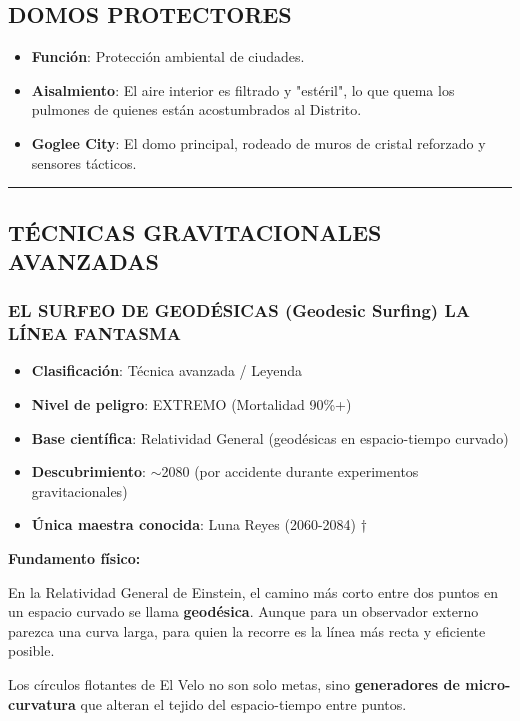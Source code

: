 \documentclass[11pt,a4paper]{report}
\begin{document}
\subsection{DOMOS PROTECTORES}
\begin{itemize}
  \item \textbf{Función}: Protección ambiental de ciudades.
  \item \textbf{Aisalmiento}: El aire interior es filtrado y "estéril", lo que quema los pulmones de quienes están acostumbrados al Distrito.
  \item \textbf{Goglee City}: El domo principal, rodeado de muros de cristal reforzado y sensores tácticos.

\end{itemize}
\bigskip\hrule\bigskip

\subsection{TÉCNICAS GRAVITACIONALES AVANZADAS}

\subsubsection{EL SURFEO DE GEODÉSICAS (Geodesic Surfing)  LA LÍNEA FANTASMA}

\begin{itemize}
  \item \textbf{Clasificación}: Técnica avanzada / Leyenda
  \item \textbf{Nivel de peligro}: EXTREMO (Mortalidad 90\%+)
  \item \textbf{Base científica}: Relatividad General (geodésicas en espacio-tiempo curvado)
  \item \textbf{Descubrimiento}: $\sim$2080 (por accidente durante experimentos gravitacionales)
  \item \textbf{Única maestra conocida}: Luna Reyes (2060-2084) †

\end{itemize}
\textbf{Fundamento físico:}

En la Relatividad General de Einstein, el camino más corto entre dos puntos en un espacio curvado se llama \textbf{geodésica}. Aunque para un observador externo parezca una curva larga, para quien la recorre es la línea más recta y eficiente posible.

Los círculos flotantes de El Velo no son solo metas, sino \textbf{generadores de micro-curvatura} que alteran el tejido del espacio-tiempo entre puntos.
\end{document}
